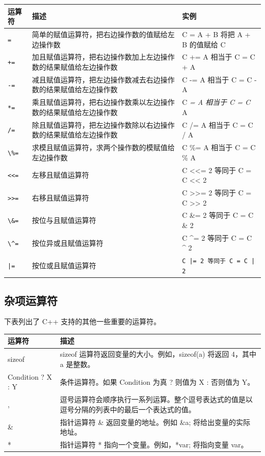 \documentclass[
  paper=a4,
  ,captions=tableheading
]{scrbook}
\newcommand{\passthrough}[1]{#1}
\begin{document}
\begin{longtable}[]{@{}lll@{}}
\toprule
运算符 & 描述 & 实例 \\
\midrule
\endhead
\passthrough{\lstinline!=!} &
简单的赋值运算符，把右边操作数的值赋给左边操作数 & C = A + B 将把 A + B
的值赋给 C \\
\passthrough{\lstinline!+=!} &
加且赋值运算符，把右边操作数加上左边操作数的结果赋值给左边操作数 & C +=
A 相当于 C = C + A \\
\passthrough{\lstinline!-=!} &
减且赋值运算符，把左边操作数减去右边操作数的结果赋值给左边操作数 & C -=
A 相当于 C = C - A \\
\passthrough{\lstinline!*=!} &
乘且赋值运算符，把右边操作数乘以左边操作数的结果赋值给左边操作数 & C
\emph{= A 相当于 C = C } A \\
\passthrough{\lstinline!/=!} &
除且赋值运算符，把左边操作数除以右边操作数的结果赋值给左边操作数 & C /=
A 相当于 C = C / A \\
\passthrough{\lstinline!\%=!} &
求模且赋值运算符，求两个操作数的模赋值给左边操作数 & C \%= A 相当于 C =
C \% A \\
\passthrough{\lstinline!<<=!} & 左移且赋值运算符 & C \textless\textless=
2 等同于 C = C \textless\textless{} 2 \\
\passthrough{\lstinline!>>=!} & 右移且赋值运算符 & C
\textgreater\textgreater= 2 等同于 C = C \textgreater\textgreater{} 2 \\
\passthrough{\lstinline!\&=!} & 按位与且赋值运算符 & C \&= 2 等同于 C =
C \& 2 \\
\passthrough{\lstinline!\^=!} & 按位异或且赋值运算符 & C \^{}= 2 等同于
C = C \^{} 2 \\
\passthrough{\lstinline!|=!} & 按位或且赋值运算符 &
\passthrough{\lstinline!C |= 2 等同于 C = C | 2!} \\
\bottomrule
\end{longtable}

\hypertarget{ux6742ux9879ux8fd0ux7b97ux7b26}{%
\subsection{杂项运算符}\label{ux6742ux9879ux8fd0ux7b97ux7b26}}

下表列出了 C++ 支持的其他一些重要的运算符。

\begin{longtable}[]{@{}ll@{}}
\toprule
运算符 & 描述 \\
\midrule
\endhead
sizeof & sizeof 运算符返回变量的大小。例如，sizeof(a) 将返回 4，其中 a
是整数。 \\
Condition ? X : Y & 条件运算符。如果 Condition 为真 ? 则值为 X :
否则值为 Y。 \\
, &
逗号运算符会顺序执行一系列运算。整个逗号表达式的值是以逗号分隔的列表中的最后一个表达式的值。 \\
\& & 指针运算符 \& 返回变量的地址。例如 \&a; 将给出变量的实际地址。 \\
* & 指针运算符 * 指向一个变量。例如，*var; 将指向变量 var。 \\
\bottomrule
\end{longtable}
\end{document}
